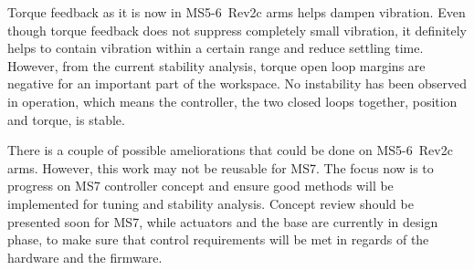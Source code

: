 Torque feedback as it is now in MS5-6~Rev2c arms helps dampen vibration. Even though torque feedback does not suppress completely small vibration, it definitely helps to contain vibration within a certain range and reduce settling time. However, from the current stability analysis, torque open loop margins are negative for an important part of the workspace. No instability has been observed in operation, which means the controller, the two closed loops together, position and torque, is stable.

There is a couple of possible ameliorations that could be done on MS5-6~Rev2c arms. However, this work may not be reusable for MS7. The focus now is to progress on MS7 controller concept and ensure good methods will be implemented for tuning and stability analysis. Concept review should be presented soon for MS7, while actuators and the base are currently in design phase, to make sure that control requirements will be met in regards of the hardware and the firmware.